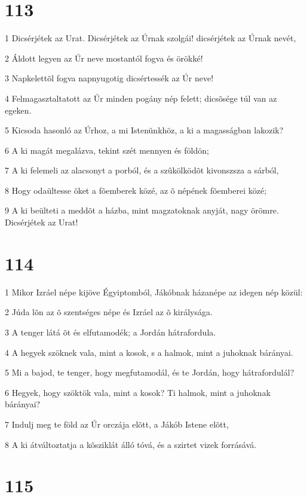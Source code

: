 \chapter{113}

\par 1 Dicsérjétek az Urat. Dicsérjétek az Úrnak szolgái! dicsérjétek az Úrnak nevét,
\par 2 Áldott legyen az Úr neve mostantól fogva és örökké!
\par 3 Napkelettõl fogva napnyugotig dicsértessék az Úr neve!
\par 4 Felmagasztaltatott az Úr minden pogány nép felett; dicsõsége túl van az egeken.
\par 5 Kicsoda hasonló az Úrhoz, a mi Istenünkhöz, a ki a magasságban lakozik?
\par 6 A ki magát megalázva, tekint szét mennyen és földön;
\par 7 A ki felemeli az alacsonyt a porból, és a szûkölködõt kivonszsza a sárból,
\par 8 Hogy odaültesse õket a fõemberek közé, az õ népének fõemberei közé;
\par 9 A ki beülteti a meddõt a házba, mint magzatoknak anyját, nagy örömre. Dicsérjétek az Urat!

\chapter{114}

\par 1 Mikor Izráel népe kijöve Égyiptomból, Jákóbnak házanépe az idegen nép közül:
\par 2 Júda lõn az õ szentséges népe és Izráel az õ királysága.
\par 3 A tenger látá õt és elfutamodék; a Jordán hátrafordula.
\par 4 A hegyek szöknek vala, mint a kosok, s a halmok, mint a juhoknak bárányai.
\par 5 Mi a bajod, te tenger, hogy megfutamodál, és te Jordán, hogy hátrafordulál?
\par 6 Hegyek, hogy szöktök vala, mint a kosok? Ti halmok, mint a juhoknak bárányai?
\par 7 Indulj meg te föld az Úr orczája elõtt, a Jákób Istene elõtt,
\par 8 A ki átváltoztatja a kõsziklát álló tóvá, és a szirtet vizek forrásává.

\chapter{115}


